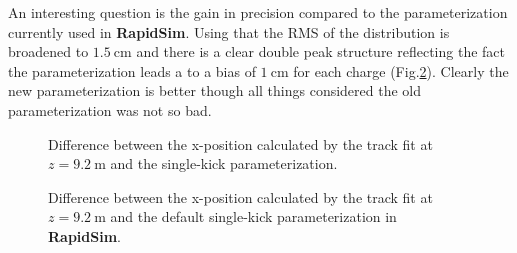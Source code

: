 An interesting question is the gain in precision compared to the
parameterization currently used in \textbf{RapidSim}. Using that the
RMS of the distribution is broadened to $1.5~\textrm{cm}$ and there is
a clear double peak structure reflecting the fact the parameterization
leads a to a bias of $1~\textrm{cm}$ for each charge (Fig.\ref{fig:dxsimple}). Clearly the new
parameterization is better though all things considered the old
parameterization was not so bad.
%
\begin{figure}[htb!]
\begin{center}
\caption{\small Difference between the x-position
calculated by the track fit at $z = 9.2~\textrm{m}$ and the single-kick
parameterization.}
\label{fig:dx}
\end{center}
\end{figure}
%
\begin{figure}[htb!]
\begin{center}
\caption{\small Difference between the x-position
calculated by the track fit at $z = 9.2~\textrm{m}$ and the default single-kick
parameterization in \textbf{RapidSim}.}
\label{fig:dxsimple}
\end{center}
\end{figure}
%